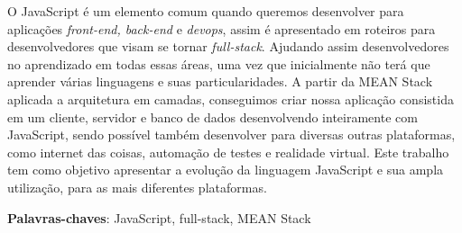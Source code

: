 \documentclass[
	12pt,				%
	openright,			%
	twoside,			%
	a4paper,			%
	english,			%
	brazil				%
	]{abntex2}
\begin{document}

\setlength{\absparsep}{18pt} %
\begin{resumo}
O JavaScript é um elemento comum quando queremos desenvolver para aplicações \textit{front-end, back-end} e \textit{devops}, assim é apresentado em roteiros para desenvolvedores que visam se tornar \textit{full-stack}. Ajudando assim desenvolvedores no aprendizado em todas essas áreas, uma vez que inicialmente não terá que aprender várias linguagens e suas particularidades. A partir da MEAN Stack aplicada a arquitetura em camadas, conseguimos criar nossa aplicação consistida em um cliente, servidor e banco de dados desenvolvendo inteiramente com JavaScript, sendo possível também desenvolver para diversas outras plataformas, como internet das coisas, automação de testes e realidade virtual. Este trabalho tem como objetivo apresentar a evolução da linguagem JavaScript e sua ampla utilização, para as mais diferentes plataformas.

 \vspace{\onelineskip}

 \textbf{Palavras-chaves}: JavaScript, full-stack, MEAN Stack
\end{resumo}
\end{document}
